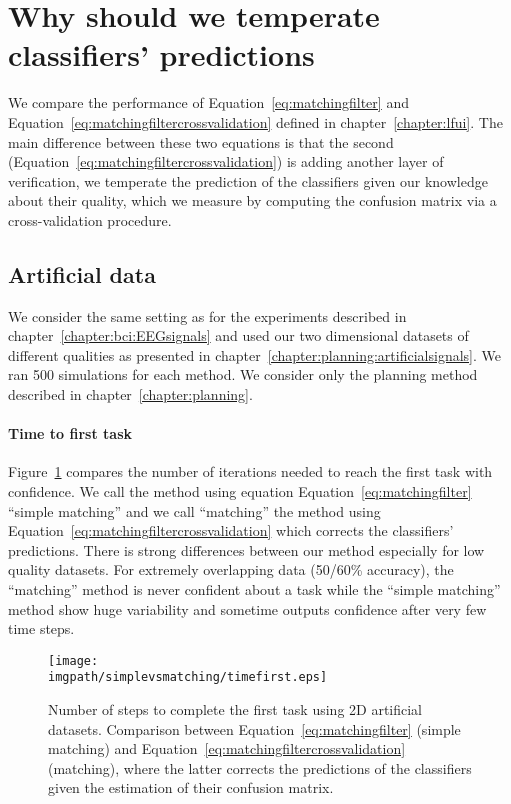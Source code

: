 
\section{Why should we temperate classifiers' predictions}
\label{chapter:limitiations:simplevsmatching}

We compare the performance of Equation~\ref{eq:matchingfilter} and Equation~\ref{eq:matchingfiltercrossvalidation} defined in chapter~\ref{chapter:lfui}. The main difference between these two equations is that the second (Equation~\ref{eq:matchingfiltercrossvalidation}) is adding another layer of verification, we temperate the prediction of the classifiers given our knowledge about their quality, which we measure by computing the confusion matrix via a cross-validation procedure.

\subsection{Artificial data}

We consider the same setting as for the experiments described in chapter~\ref{chapter:bci:EEGsignals} and used our two dimensional datasets of different qualities as presented in chapter~\ref{chapter:planning:artificialsignals}. We ran 500 simulations for each method. We consider only the planning method described in chapter~\ref{chapter:planning}.

\paragraph{Time to first task}  Figure~\ref{fig:timefirst_simplevsmatching} compares the number of iterations needed to reach the first task with confidence. We call the method using equation Equation~\ref{eq:matchingfilter} ``simple matching'' and we call ``matching'' the method using Equation~\ref{eq:matchingfiltercrossvalidation} which corrects the classifiers' predictions. There is strong differences between our method especially for low quality datasets. For extremely overlapping data (50/60\% accuracy), the ``matching'' method is never confident about a task while the ``simple matching'' method show huge variability and sometime outputs confidence after very few time steps. 

\begin{figure}[!htbp]
\centering
\texttt{[image: \\imgpath/simplevsmatching/timefirst.eps]}
\caption{Number of steps to complete the first task using 2D artificial datasets. Comparison between Equation~\ref{eq:matchingfilter} (simple matching) and Equation~\ref{eq:matchingfiltercrossvalidation} (matching), where the latter corrects the predictions of the classifiers given the estimation of their confusion matrix.}
\label{fig:timefirst_simplevsmatching}
\end{figure} 

